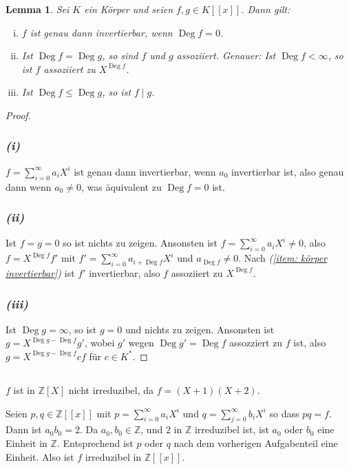 \documentclass[a4paper,10pt]{article}
\newcounter{satze}
\newtheorem{lem}[satze]{Lemma}
\theoremstyle{definition}
\newcommand{\Z}{\mathbb{Z}}
\newcommand{\Deg}{\operatorname{Deg}}
\begin{document}
\begin{lem} \label{lem: starkes Lemma}
 Sei $K$ ein Körper und seien $f,g \in K[\![x]\!]$. Dann gilt:
 \begin{enumerate}[(i)]
  \item $f$ ist genau dann invertierbar, wenn $\Deg f = 0$. \label{item: körper invertierbar}
  \item Ist $\Deg f = \Deg g$, so sind $f$ und $g$ assoziiert. Genauer: Ist $\Deg f < \infty$, so ist $f$ assoziiert zu $X^{\Deg f}$.
  \item Ist $\Deg f \leq \Deg g$, so ist $f \mid g$.
 \end{enumerate}
\end{lem}
\begin{proof}
 \subsubsection*{\emph{(i)}}
  $f = \sum_{i=0}^{\infty} a_i X^i$ ist genau dann invertierbar, wenn $a_0$ invertierbar ist, also genau dann wenn $a_0 \neq 0$, was äquivalent zu $\Deg f = 0$ ist.
 \subsubsection*{\emph{(ii)}}
  Ist $f = g = 0$ so ist nichts zu zeigen. Ansonsten ist $f = \sum_{i=0}^\infty a_i X^i \neq 0$, also $f = X^{\Deg f} f'$ mit $f' = \sum_{i=0}^\infty a_{i+\Deg f} X^i$ und $a_{\Deg f} \neq 0$. Nach \emph{(\ref{item: körper invertierbar})} ist $f'$ invertierbar, also $f$ assoziiert zu $X^{\Deg f}$.
 \subsubsection*{\emph{(iii)}}
 Ist $\Deg g = \infty$, so ist $g = 0$ und nichts zu zeigen. Ansonsten ist $g = X^{\Deg g - \Deg f} g'$, wobei $g'$ wegen $\Deg g' = \Deg f$ assozziert zu $f$ ist, also $g = X^{\Deg g - \Deg f} c f$ für $c \in K^*$.
\end{proof}


\subsection{}
$f$ ist in $\Z[X]$ nicht irreduzibel, da $f = (X+1)(X+2)$.

Seien $p,q \in \Z[\![x]\!]$ mit $p = \sum_{i=0}^\infty a_i X^i$ und $q = \sum_{j=0}^\infty b_i X^i$ so dass $pq = f$. Dann ist $a_0 b_0 = 2$. Da $a_0, b_0 \in \Z$, und $2$ in $\Z$ irreduzibel ist, ist $a_0$ oder $b_0$ eine Einheit in $\Z$. Entsprechend ist $p$ oder $q$ nach dem vorherigen Aufgabenteil eine Einheit. Also ist $f$ irreduzibel in $\Z[\![x]\!]$.
\end{document}
